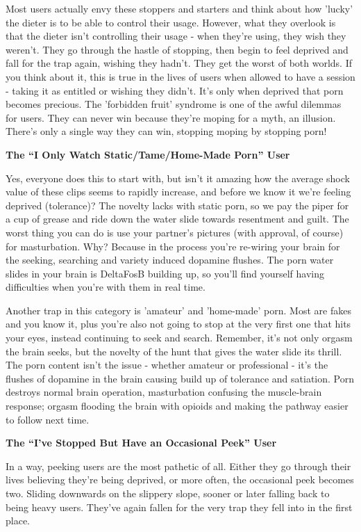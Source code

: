\documentclass[
]{book}
\begin{document}
Most users actually envy these stoppers and starters and think about how 'lucky' the dieter is to be able to control their usage. However, what they overlook is that the dieter isn't controlling their usage - when they're using, they wish they weren't. They go through the hastle of stopping, then begin to feel deprived and fall for the trap again, wishing they hadn't. They get the worst of both worlds. If you think about it, this is true in the lives of users when allowed to have a session - taking it as entitled or wishing they didn't. It's only when deprived that porn becomes precious. The 'forbidden fruit' syndrome is one of the awful dilemmas for users. They can never win because they're moping for a myth, an illusion. There's only a single way they can win, stopping moping by stopping porn!

\textbf{The ``I Only Watch Static/Tame/Home-Made Porn'' User}

Yes, everyone does this to start with, but isn't it amazing how the average shock value of these clips seems to rapidly increase, and before we know it we're feeling deprived (tolerance)? The novelty lacks with static porn, so we pay the piper for a cup of grease and ride down the water slide towards resentment and guilt. The worst thing you can do is use your partner's pictures (with approval, of course) for masturbation. Why? Because in the process you're re-wiring your brain for the seeking, searching and variety induced dopamine flushes. The porn water slides in your brain is DeltaFosB building up, so you'll find yourself having difficulties when you're with them in real time.

Another trap in this category is 'amateur' and 'home-made' porn. Most are fakes and you know it, plus you're also not going to stop at the very first one that hits your eyes, instead continuing to seek and search. Remember, it's not only orgasm the brain seeks, but the novelty of the hunt that gives the water slide its thrill. The porn content isn't the issue - whether amateur or professional - it's the flushes of dopamine in the brain causing build up of tolerance and satiation. Porn destroys normal brain operation, masturbation confusing the muscle-brain response; orgasm flooding the brain with opioids and making the pathway easier to follow next time.

\textbf{The ``I've Stopped But Have an Occasional Peek'' User}

In a way, peeking users are the most pathetic of all. Either they go through their lives believing they're being deprived, or more often, the occasional peek becomes two. Sliding downwards on the slippery slope, sooner or later falling back to being heavy users. They've again fallen for the very trap they fell into in the first place.
\end{document}
